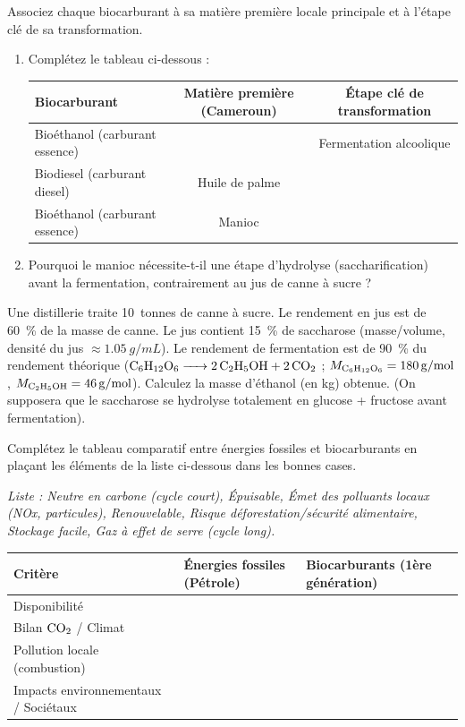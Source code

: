 \documentclass[11pt]{article}
\begin{document}
\begin{exercice}
Associez chaque biocarburant à sa matière première locale principale et à l'étape clé de sa transformation.
\begin{enumerate}
    \item Complétez le tableau ci-dessous :
    \begin{tabularx}{\linewidth}{|X|c|c|}
    \hline
    \textbf{Biocarburant} & \textbf{Matière première (Cameroun)} & \textbf{Étape clé de transformation} \\
    \hline
    Bioéthanol (carburant essence) &  & Fermentation alcoolique \\
    \hline
    Biodiesel (carburant diesel) & Huile de palme &  \\
    \hline
    Bioéthanol (carburant essence) & Manioc &  \\
    \hline
    \end{tabularx}
    \item Pourquoi le manioc nécessite-t-il une étape d'hydrolyse (saccharification) avant la fermentation, contrairement au jus de canne à sucre ?
\end{enumerate}
\end{exercice}

\begin{exercice}
Une distillerie traite \SI{10}{tonnes} de canne à sucre. Le rendement en jus est de \SI{60}{\%} de la masse de canne. Le jus contient \SI{15}{\%} de saccharose (masse/volume, densité du jus $\approx \SI{1,05}{g/mL}$). Le rendement de fermentation est de \SI{90}{\%} du rendement théorique ($\ce{C6H12O6 -> 2 C2H5OH + 2 CO2}$ ; $M_{\ce{C6H12O6}}=\SI{180}{g/mol}$, $M_{\ce{C2H5OH}}=\SI{46}{g/mol}$).
Calculez la masse d'éthanol (en kg) obtenue. (On supposera que le saccharose se hydrolyse totalement en glucose + fructose avant fermentation).
\end{exercice}

\begin{exercice}
Complétez le tableau comparatif entre énergies fossiles et biocarburants en plaçant les éléments de la liste ci-dessous dans les bonnes cases.
\begin{center}
\textit{Liste : Neutre en carbone (cycle court), Épuisable, Émet des polluants locaux (NOx, particules), Renouvelable, Risque déforestation/sécurité alimentaire, Stockage facile, Gaz à effet de serre (cycle long).}
\end{center}
\begin{tabularx}{\linewidth}{|X|X|X|}
\hline
\textbf{Critère} & \textbf{Énergies fossiles (Pétrole)} & \textbf{Biocarburants (1ère génération)} \\
\hline
Disponibilité &  &  \\
\hline
Bilan $\ce{CO2}$ / Climat &  &  \\
\hline
Pollution locale (combustion) &  &  \\
\hline
Impacts environnementaux / Sociétaux &  &  \\
\hline
\end{tabularx}
\end{exercice}
\end{document}
